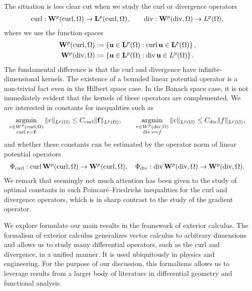 \documentclass[a4paper]{article}
\begin{document}
The situation is less clear cut when we study the curl or divergence operators
\begin{align*}
    \operatorname{curl} : {\mathbf W}^{p}(\operatorname{curl},\Omega) \rightarrow {\mathbf L}^{p}(\operatorname{curl},\Omega),
    \qquad 
    \operatorname{div} : {\mathbf W}^{p}(\operatorname{div},\Omega) \rightarrow L^{p}(\Omega),
\end{align*}
where we use the function spaces
\begin{align*}
    {\mathbf W}^{p}(\operatorname{curl},\Omega) &:= \left\{ {\mathbf u} \in {\mathbf L}^p(\Omega) : \operatorname{curl} {\mathbf u} \in {\mathbf L}^p(\Omega) \right\}
    ,
    \\
    {\mathbf W}^{p}(\operatorname{div},\Omega) &:= \left\{ {\mathbf u} \in {\mathbf L}^p(\Omega) : \operatorname{div} {\mathbf u} \in L^p(\Omega) \right\}
    .
\end{align*}
The fundamental difference is that the curl and divergence have infinite-dimensional kernels. 
{\color{red}The existence of a bounded linear potential operator is a non-trivial fact even in the Hilbert space case. }
In the Banach space case, it is not immediately evident that the kernels of these operators are complemented.
We are interested in constants for inequalities such as 
\begin{align*}
    \operatorname*{{\rm argmin}}\limits_{ \substack{ v \in W^{p}(\operatorname{curl},\Omega) \\ \operatorname{curl} v = {\mathbf f} } } \| v \|_{L^{p}(\Omega)}
    \leq 
    C_{\operatorname{curl}}
    \| {\mathbf f} \|_{L^{p}(\Omega)}
    ,
    \qquad 
    \operatorname*{{\rm argmin}}\limits_{ \substack{ v \in W^{p}(\operatorname{div},\Omega) \\ \operatorname{div} v = f } } \| v \|_{L^{p}(\Omega)}
    \leq 
    C_{\operatorname{div}}
    \| f \|_{L^{p}(\Omega)}
    ,
\end{align*}
and whether these constants can be estimated by the operator norm of linear potential operators 
\begin{align*}
    \Phi_{\operatorname{curl}} : \operatorname{curl} {\mathbf W}^{p}(\operatorname{curl},\Omega) \rightarrow {\mathbf W}^{p}(\operatorname{curl},\Omega)
    ,
    \quad 
    \Phi_{\operatorname{div}} : \operatorname{div} {\mathbf W}^{p}(\operatorname{div},\Omega) \rightarrow {\mathbf W}^{p}(\operatorname{div},\Omega)
    .
\end{align*}
We remark that seemingly not much attention has been given to the study of optimal constants in such Poincar\'e--Friedrichs inequalities for the curl and divergence operators, 
which is in sharp contrast to the study of the gradient operator. 

We explore formulate our main results in the framework of exterior calculus.
The formalism of exterior calculus generalizes vector calculus to arbitrary dimensions and allows us to study many differential operators, such as the curl and divergence, in a unified manner. 
%
It is used ubiquitously in physics and engineering. 
%
For the purpose of our discussion, this formalisms allows us to leverage results from a larger body of literature in differential geometry and functional analysis. 
\\
\end{document}
